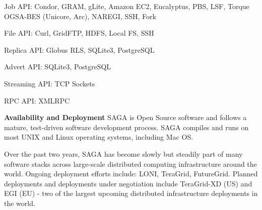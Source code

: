 \documentclass[a0b,portrait]{a0poster}
\begin{document}
\begin{textblock}{7}
\begin{list}{}{\leftmargin=1.6em}
\item{Job API: Condor, GRAM, gLite, Amazon EC2, Eucalyptus, PBS, LSF, Torque
OGSA-BES (Unicore, Arc), NAREGI, SSH, Fork}
\item{File API: Curl, GridFTP, HDFS, Local FS, SSH} 
\item{Replica API: Globus RLS, SQLite3, PostgreSQL}
\item{Advert API: SQLite3, PostgreSQL} 
\item{Streaming API: TCP Sockets} 
\item{RPC API: XMLRPC} 
\end{list}

\textbf{\color{DarkBlue} Availability and Deployment } SAGA is Open Source
software and follows a mature, test-driven software development process. SAGA
compiles and runs on most UNIX and Linux operating systems, including Mac OS.

Over the past two years, SAGA has become slowly but steadily part of many
software stacks across large-scale distributed computing infrastructure around
the world. Ongoing deployment efforts include: LONI, TeraGrid, FutureGrid.
Planned deployments and deployments under negotiation include TeraGrid-XD (US)
and EGI (EU) - two of the largest upcoming distributed infrastructure
deployments in the world.



\end{textblock}
\end{document}
